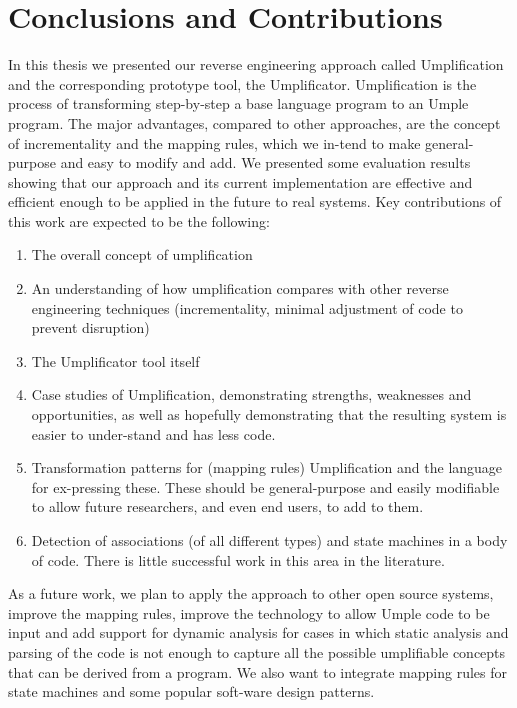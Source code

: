 \chapter{Conclusions and Contributions}
\lhead{\emph{\leftmark}}  %
In this thesis we presented our reverse engineering approach called Umplification and the corresponding prototype tool, the Umplificator. Umplification is the process of transforming step-by-step a base language program to an Umple program. The major advantages, compared to other approaches, are the concept of incrementality and the mapping rules, which we in-tend to make general-purpose and easy to modify and add.  
We presented some evaluation results showing that our approach and its current implementation are effective and efficient enough to be applied in the future to real systems. 
Key contributions of this work are expected to be the following:
\begin{enumerate}
\item The overall concept of umplification
\item An understanding of how umplification compares with other reverse engineering techniques (incrementality, minimal adjustment of code to prevent disruption)
\item The Umplificator tool itself
\item Case studies of Umplification, demonstrating strengths, weaknesses and opportunities, as well as hopefully demonstrating that the resulting system is easier to under-stand and has less code.
\item Transformation patterns for (mapping rules) Umplification and the language for ex-pressing these. These should be general-purpose and easily modifiable to allow future researchers, and even end users, to add to them.
\item Detection of associations (of all different types) and state machines in a body of code. There is little successful work in this area in the literature.
\end{enumerate}

	As a future work, we plan to apply the approach to other open source systems, improve the mapping rules, improve the technology to allow Umple code to be input and add support for dynamic analysis for cases in which static analysis and parsing of the code is not enough to capture all the possible umplifiable concepts that can be derived from a program. We also want to integrate mapping rules for state machines and some popular soft-ware design patterns.

